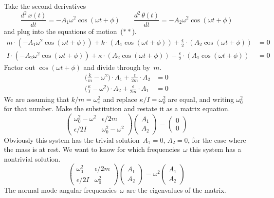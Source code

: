 Take the second derivatives 
\begin{equation*}
  \frac{d^2\,x(t)}{dt}=-A_1\omega^2\cos(\omega t+\phi)
  \qquad
  \frac{d^2\,\theta(t)}{dt}=-A_2\omega^2\cos(\omega t+\phi)
\end{equation*}
and plug into the equations of motion~($**$).
\begin{align*}
  m\cdot(-A_1\omega^2\cos(\omega t+\phi))
      +k\cdot (A_1\cos(\omega t+\phi))
      +\frac{\epsilon}{2}\cdot (A_2\cos(\omega t+\phi)) 
      &=0  \\
  I\cdot(-A_2\omega^2\cos(\omega t+\phi))
      +\kappa\cdot (A_2\cos(\omega t+\phi))
      +\frac{\epsilon}{2}\cdot (A_1\cos(\omega t+\phi))  
      &=0  
\end{align*}
Factor out $\cos(\omega t+\phi)$ and divide through by~$m$.
\begin{align*}
  \big(\frac{k}{m}-\omega^2\big)\cdot A_1 
      +\frac{\epsilon}{2m}\cdot A_2 
      &=0  \\
  \big(\frac{\kappa}{I}-\omega^2\big)\cdot A_2
      +\frac{\epsilon}{2m}\cdot A_1  
      &=0  
\end{align*}
We are assuming that $k/m=\omega_{x}^2$ and
replace $\kappa/I=\omega_{\theta}^2$ are equal, and writing $\omega_0^2$
for that number.
Make the substitution and restate it as a matrix equation.
\begin{equation*}
  \begin{pmatrix}
    \omega_0^2-\omega^2    &\epsilon/2m  \\
    \epsilon/2I &\omega_0^2-\omega^2 
  \end{pmatrix}
  \begin{pmatrix}
    A_1 \\
    A_2
  \end{pmatrix}
  =
  \begin{pmatrix}
    0 \\
    0
  \end{pmatrix}
\end{equation*}
Obviously this system has the trivial solution~$A_1=0$, $A_2=0$,
for the case where the mass is at rest.
We want to know for which frequencies~$\omega$ this system has a nontrivial
solution. 
\begin{equation*}
  \begin{pmatrix}
    \omega_0^2    &\epsilon/2m  \\
    \epsilon/2I  &\omega_0^2 
  \end{pmatrix}
  \begin{pmatrix}
    A_1 \\
    A_2
  \end{pmatrix}
  =
  \omega^2
  \begin{pmatrix}
    A_1 \\
    A_2
  \end{pmatrix}
\end{equation*}
The normal mode angular frequencies~$\omega$ are the eigenvalues of the matrix.

